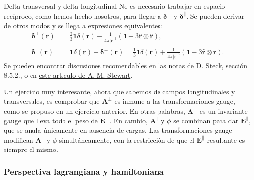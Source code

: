\begin{observation}
    {Delta transversal y delta longitudinal}
    \label{obs.1-deltas_transversal_longitudinal}
    No es necesario trabajar en espacio recíproco, como hemos hecho nosotros, para llegar a \(\boldsymbol{\delta}^\perp\) y \(\boldsymbol{\delta}^\parallel\). Se pueden derivar de otros modos y se llega a expresiones equivalentes:
    \begin{subequations}
        \begin{align}
            \label{eq.1-transverse_delta_space}
            \boldsymbol{\delta}^\perp(\mathbf{r}) &= \frac{2}{3}\mathbf{1}\delta(\mathbf{r}) - \frac{1}{4\pi |\mathbf{r}|^3} \left(\mathbf{1} - 3\hat{\mathbf{r}}\otimes\hat{\mathbf{r}}\right),\\
            \boldsymbol{\delta}^\parallel(\mathbf{r}) &= \mathbf{1}\delta(\mathbf{r}) - \boldsymbol{\delta}^\perp(\mathbf{r}) = \frac{1}{3}\mathbf{1}\delta(\mathbf{r}) + \frac{1}{4\pi |\mathbf{r}|^3} \left(\mathbf{1} - 3\hat{\mathbf{r}}\otimes\hat{\mathbf{r}}\right).
        \end{align}
    \end{subequations}
    Se pueden encontrar discusiones recomendables en \href{https://atomoptics.uoregon.edu/~dsteck/teaching/quantum-optics/}{las notas de D. Steck}, sección 8.5.2., o en \href{https://arxiv.org/abs/0801.0335v2}{este artículo de A. M. Stewart}.
\end{observation}

Un ejercicio muy interesante, ahora que sabemos de campos longitudinales y transversales, es comprobar que \(\mathbf{A}^\perp\) es inmune a las transformaciones gauge, como se propuso en un ejercicio anterior. En otras palabras, \(\mathbf{A}^\perp\) es un invariante gauge que lleva todo el peso de \(\mathbf{E}^\perp\). En cambio, \(\mathbf{A}^\parallel\) y \(\phi\) se combinan para dar \(\mathbf{E}^\parallel\), que se anula únicamente en ausencia de cargas. Las transformaciones gauge modifican \(\mathbf{A}^\parallel\) y \(\phi\) simultáneamente, con la restricción de que el \(\mathbf{E}^\parallel\) resultante es siempre el mismo.

\subsubsection{Perspectiva lagrangiana y hamiltoniana}

